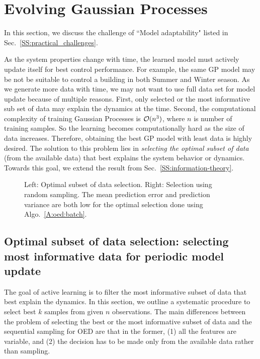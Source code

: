 \section{Evolving Gaussian Processes}
\label{S:active}

In this section, we discuss the challenge of ``Model adaptability" listed in Sec.~\ref{SS:practical_challenges}.

As the system properties change with time, the learned model must actively update itself for best control performance.
For example, the same GP model may be not be suitable to control a building in both Summer and Winter season.
As we generate more data with time, we may not want to use full data set for model update because of multiple reasons.
First, only selected or the most informative sub set of data may explain the dynamics at the time. Second, the computational complexity of training Gaussian Processes is $\mathcal{O}(n^3)$, where $n$ is number of training samples. So the learning becomes computationally hard as the size of data increases.
Therefore, obtaining the best GP model with least data is highly desired. The solution to this problem lies in \textit{selecting the optimal subset of data} (from the available data) that best explains the system behavior or dynamics.
Towards this goal, we extend the result from Sec.~\ref{SS:information-theory}.

\begin{figure*}[t]
	\centering
	\setlength{} 
	\setlength{}
	 \hspace{0.5cm}
	
	\caption{Left: Optimal subset of data selection. Right: Selection using random sampling. The mean prediction error and prediction variance are both low for the optimal selection done using Algo.~\ref{A:oed:batch}.}
	\captionsetup{justification=centering}
	\label{F:active:example}
\end{figure*}

\subsection{Optimal subset of data selection: selecting most informative data for periodic model update}

The goal of active learning is to filter the most informative subset of data that best explain the dynamics.
In this section, we outline a systematic procedure to select best $k$ samples from given $n$ observations.
The main differences between the problem of selecting the best or the most informative subset of data and the sequential sampling for OED are that in the former, (1) all the features are variable, and (2) the decision has to be made only from the available data rather than sampling. 

